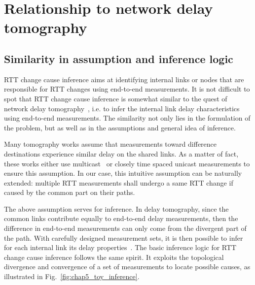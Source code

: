 \section{Relationship to network delay tomography}

\subsection{Similarity in assumption and inference logic}
RTT change cause inference aims at identifying internal links or nodes that are responsible for RTT changes using end-to-end measurements.
It is not difficult to spot that RTT change cause inference is somewhat similar to the quest of network delay tomography~\cite{Coates2002}, i.e. to infer the internal link delay characteristics using end-to-end measurements. The similarity not only lies in the formulation of the problem, but as well as in the assumptions and general idea of inference.

Many tomography works assume that measurements toward difference destinations experience similar delay on the shared links. As a matter of fact, these works either use multicast~\cite{LoPresti2002} or closely time spaced unicast measurements\cite{Shih2003,Tsang2003} to ensure this assumption. In our case, this intuitive assumption can be naturally extended: multiple RTT measurements shall undergo a same RTT change if caused by the common part on their paths.

The above assumption serves for inference. In delay tomography, since the common links contribute equally to end-to-end delay measurements, then the difference in end-to-end measurements can only come from the divergent part of the path. With carefully designed measurement sets, it is then possible to infer for each internal link its delay properties~\cite{Lawrence2006}.
The basic inference logic for RTT change cause inference follows the same spirit. It exploits the topological divergence and convergence of a set of measurements to locate possible causes, as illustrated in Fig.~\ref{fig:chap5_toy_inference}.


